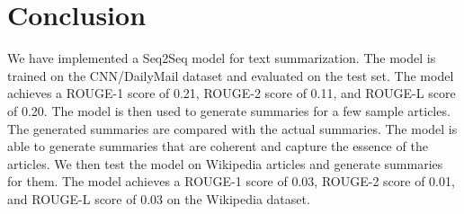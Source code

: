 \documentclass{article}
\begin{document}
\section{Conclusion}
We have implemented a Seq2Seq model for text summarization. The model is trained on the CNN/DailyMail dataset and evaluated on the test set. The model achieves a ROUGE-1 score of 0.21, ROUGE-2 score of 0.11, and ROUGE-L score of 0.20. The model is then used to generate summaries for a few sample articles. The generated summaries are compared with the actual summaries. The model is able to generate summaries that are coherent and capture the essence of the articles. We then test the model on Wikipedia articles and generate summaries for them. The model achieves a ROUGE-1 score of 0.03, ROUGE-2 score of 0.01, and ROUGE-L score of 0.03 on the Wikipedia dataset.
\end{document}
